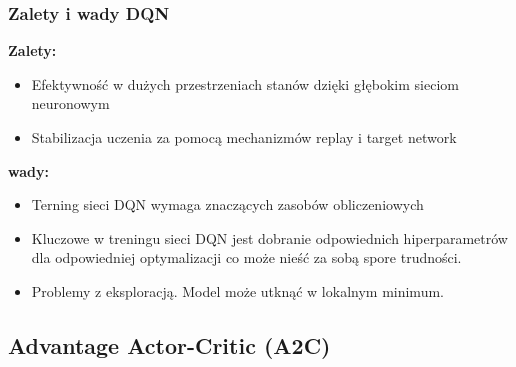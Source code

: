 \documentclass[a4paper, 10pt]{article}
\begin{document}
    \subsubsection{Zalety i wady DQN}
    \textbf{Zalety:}
    \begin{itemize}
        \item Efektywność w dużych przestrzeniach stanów dzięki głębokim sieciom neuronowym
        \item Stabilizacja uczenia za pomocą mechanizmów replay i target network
    \end{itemize}
    \textbf{wady:}
    \begin{itemize}
        \item Terning sieci DQN wymaga znaczących zasobów obliczeniowych
        \item Kluczowe w treningu sieci DQN jest dobranie odpowiednich hiperparametrów dla odpowiedniej optymalizacji
        co może nieść za sobą spore trudności.
        \item Problemy z eksploracją. Model może utknąć w lokalnym minimum.
    \end{itemize}
    \subsection{Advantage Actor-Critic (A2C)}
\end{document}
